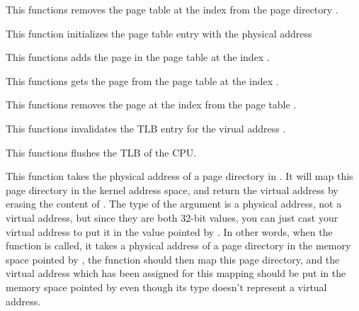 {
  This functions removes the page table at the index  from the
  page directory .
}

{
  This function initializes the page table entry  with the
  physical address 
}

{
  This functions adds the page  in the page table
   at the index .
}

{
  This functions gets the page  from the page table
   at the index .
}

{
  This functions removes the page at the index  from the
  page table .
}

{
  This functions invalidates the TLB entry for the virual address
  .
}

{
  This functions flushes the TLB of the CPU.
}

{
  This function takes the physical address of a page directory in .
  It will map this page directory in the kernel address space, and return
  the virtual address by erasing the content of .
  The type of the argument is a physical address, not a virtual address, but
  since they are both 32-bit values, you can just cast your virtual address
  to put it in the value pointed by .
  In other words, when the function is called, it takes a physical address of
  a page directory in the memory space pointed by , the function
  should then map this page directory, and the virtual address which has been
  assigned for this mapping should be put in the memory space pointed by
   even though its type doesn't represent a virtual address.
}

